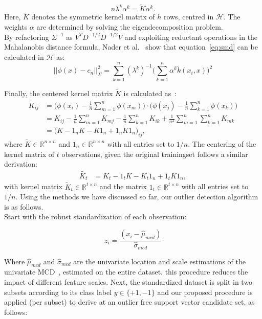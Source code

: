 \documentclass[preprint,12pt]{elsarticle}
\begin{document}
	\begin{equation}
	n \lambda^k \alpha^k = \tilde{K} \alpha^k.
	\end{equation}
	Here, $\tilde{K}$ denotes the symmetric kernel matrix of $h$ rows, centred in $\mathcal{H}$. The weights $\alpha$ are determined by solving the eigendecomposition problem. \\
	By refactoring $\Sigma^{-1}$ as $V^T D^{-1/2} D^{-1/2} V$ and exploiting reductant operations in the Mahalanobis distance formula, Nader et al.~\cite{nader2014mahalanobis} show that equation~\eqref{eq:smd} can be calculated in $\mathcal{H}$ as:
	\begin{equation}
	\label{eq:Mahal}
	||\phi(x) - c_n||^2_{\Sigma} = \sum_{k=1}^{n} (\lambda^k)^{-1} \big( \sum_{k=1}^{n} \alpha^k \tilde{k}(x_i, x) \big)^2
	\end{equation}	
	
	Finally, the centered kernel matrix $\tilde{K}$ is calculated as~\cite{scholkopf1998nonlinear}:
	\begin{align}
	\label{eq:centerKh}
	\tilde{K}_{ij} &= \Big(\phi(x_i) - \frac{1}{n}\sum_{m=1}^n\phi(x_m)\Big) \cdot \Big(\phi(x_j) - \frac{1}{n}\sum_{k=1}^n\phi(x_k)\Big) \\
	&= K_{ij} - \frac{1}{n}\sum_{m=1}^n K_{mj} - \frac{1}{n}\sum_{k=1}^n K_{ik} + \frac{1}{n^2}\sum_{m=1}^n\sum_{k=1}^n K_{mk} \\
	&= \Big(K - 1_n K - K1_n + 1_n K1_n\Big)_{ij},
	\end{align}
	where $ \tilde{K} \in \mathbb{R}^{n \times n}$ and $1_n \in \mathbb{R}^{n\times n}$ with all entries set to $1/n$. 
	The centering of the kernel matrix of $t$ observations, given the original trainingset follows a similar derivation:
	\begin{align}
	\label{eq:centerKt}
	\tilde{K_t} &= K_t - 1_t K - K_t 1_n + 1_t K1_n,
	\end{align}
	with kernel matrix $ \tilde{K}_t \in \mathbb{R}^{t \times n}$ and the matrix $1_t \in \mathbb{R}^{t \times n}$ with all entries set to $1/n$. Using the methods we have discussed so far, our outlier detection algorithm is as follows. \\
	
	Start with the robust standardization of each observation: 
	
	\begin{equation}
		z_i = \frac{(x_i - \hat{\mu}_{mcd})}{\hat{\sigma}_{mcd}} 
	\end{equation}
	
	Where $\hat{\mu}_{mcd}$ and $\hat{\sigma}_{mcd}$ are the univariate location and scale estimations of the univariate MCD~\cite{rousseeuw1999fast}, estimated on the entire dataset. this procedure reduces the impact of different feature scales. Next, the standardized dataset is split in two subsets according to its class label $y \in \{+1, -1\}$ and our proposed  procedure is applied (per subset) to derive at an outlier free support vector candidate set, as follows:
	
\end{document}
